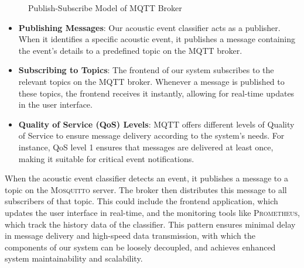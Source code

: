 \begin{figure}[htbp]
  \centering
  \caption{\label{fig:mqtt} Publish-Subscribe Model of MQTT Broker}
\end{figure}

\begin{itemize}
  \item \textbf{Publishing Messages}: Our acoustic event classifier acts as a publisher. When it identifies a specific acoustic event, it publishes a message containing the event's details to a predefined topic on the MQTT broker.
  \item \textbf{Subscribing to Topics}: The frontend of our system subscribes to the relevant topics on the MQTT broker. Whenever a message is published to these topics, the frontend receives it instantly, allowing for real-time updates in the user interface.
  \item \textbf{Quality of Service (QoS) Levels}: MQTT offers different levels of Quality of Service to ensure message delivery according to the system's needs. For instance, QoS level 1 ensures that messages are delivered at least once, making it suitable for critical event notifications.
\end{itemize}

When the acoustic event classifier detects an event, it publishes a message to a topic on the \textsc{Mosquitto} server. The broker then distributes this message to all subscribers of that topic. This could include the frontend application, which updates the user interface in real-time, and the monitoring tools like \textsc{Prometheus}, which track the history data of the classifier. This pattern ensures minimal delay in message delivery and high-speed data transmission, with which the components of our system can be loosely decoupled, and achieves enhanced system maintainability and scalability.

